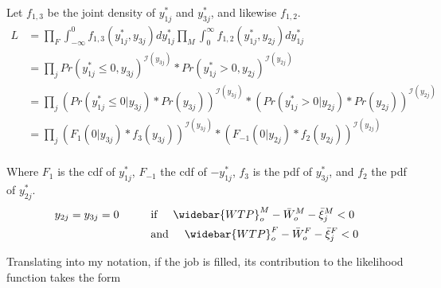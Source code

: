 \documentclass[12pt]{article}
\begin{document}
Let $f_{1,3}$ be the joint density of $y_{1j}^*$ and $y_{3j}^*$, and likewise $f_{1,2}$.
\begin{align*}
L &= \prod_F \int_{-\infty}^0 f_{1,3}(y_{1j}^*,y_{3j}) dy_{1j}^* \prod_M \int_{0}^{\infty} f_{1,2}(y_{1j}^*,y_{2j}) dy_{1j}^* \\
&= \prod_j Pr(y_{1j}^* \leq 0, y_{3j})^{\mathcal{I}(y_{3j})}*Pr(y_{1j}^* > 0, y_{2j})^{\mathcal{I}(y_{2j})} \\
&= \prod_j (Pr(y_{1j}^* \leq 0 | y_{3j})*Pr(y_{3j}))^{\mathcal{I}(y_{3j})}*(Pr(y_{1j}^* > 0| y_{2j})*Pr(y_{2j}))^{\mathcal{I}(y_{2j})}\\
&= \prod_j (F_{1}(0|y_{3j})*f_3(y_{3j}))^{\mathcal{I}(y_{3j})}*(F_{-1}( 0| y_{2j})*f_2(y_{2j}))^{\mathcal{I}(y_{2j})}\\
\end{align*}

Where $F_1$ is the cdf of $y_{1j}^*$, $F_{-1}$ the cdf of $-y_{1j}^*$, $f_3$ is the pdf of $y_{3j}^*$, and $f_2$ the pdf of $y_{2j}^*$.
\begin{align*}
 y_{2j}=y_{3j}=0 \hspace{10mm} &\text{if} \hspace{5mm} \widebar{WTP}^M_o - \bar{W}^M_o - \bar{\xi}^M_j < 0\\
 &\text{and} \hspace{5mm} \widebar{WTP}^F_o - \bar{W}^F_o -  \bar{\xi}^F_j < 0 \\
\end{align*}

Translating into my notation, if the job is filled, its contribution to the likelihood function takes the form 

\end{document}
